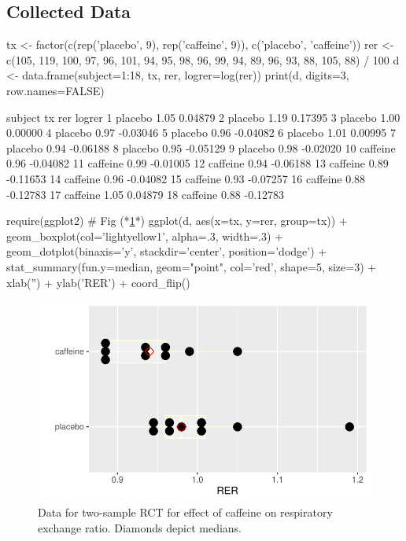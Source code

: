 \subsection{Collected Data}
\begin{Schunk}
\begin{Sinput}
tx <- factor(c(rep('placebo', 9), rep('caffeine', 9)), c('placebo', 'caffeine'))
rer <- c(105, 119, 100, 97, 96, 101, 94, 95, 98,
         96, 99, 94, 89, 96, 93, 88, 105, 88) / 100
d <- data.frame(subject=1:18, tx, rer, logrer=log(rer))
print(d, digits=3, row.names=FALSE)
\end{Sinput}
\begin{Soutput}
 subject       tx  rer   logrer
       1  placebo 1.05  0.04879
       2  placebo 1.19  0.17395
       3  placebo 1.00  0.00000
       4  placebo 0.97 -0.03046
       5  placebo 0.96 -0.04082
       6  placebo 1.01  0.00995
       7  placebo 0.94 -0.06188
       8  placebo 0.95 -0.05129
       9  placebo 0.98 -0.02020
      10 caffeine 0.96 -0.04082
      11 caffeine 0.99 -0.01005
      12 caffeine 0.94 -0.06188
      13 caffeine 0.89 -0.11653
      14 caffeine 0.96 -0.04082
      15 caffeine 0.93 -0.07257
      16 caffeine 0.88 -0.12783
      17 caffeine 1.05  0.04879
      18 caffeine 0.88 -0.12783
\end{Soutput}
\end{Schunk}

\begin{Schunk}
\begin{Sinput}
require(ggplot2)   # Fig (*\ref{fig:htest-reraa}*)
ggplot(d, aes(x=tx, y=rer, group=tx)) +
  geom_boxplot(col='lightyellow1', alpha=.3, width=.3) + 
  geom_dotplot(binaxis='y', stackdir='center', position='dodge') +
  stat_summary(fun.y=median, geom="point", col='red', shape=5, size=3) +
  xlab('') + ylab('RER') + coord_flip() 
\end{Sinput}
\begin{figure}[htbp]

\centerline{\includegraphics[width=\maxwidth]{htest-reraa-1} }

\caption[Two-sample parallel group RCT]{Data for two-sample RCT for effect of caffeine on respiratory exchange ratio. Diamonds depict medians.}\label{fig:htest-reraa}
\end{figure}
\end{Schunk}

